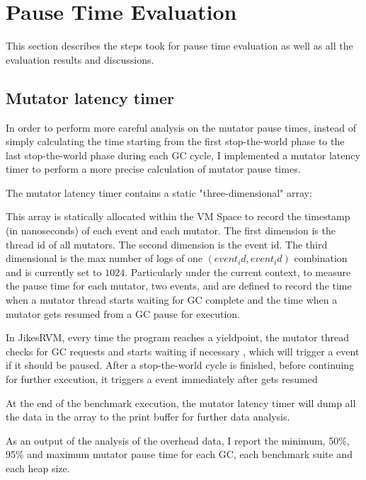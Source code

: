 \section{Pause Time Evaluation} %
\label{sec:pausetime}

This section describes the steps took for pause time evaluation as well as
all the evaluation results and discussions.

\subsection{Mutator latency timer}

In order to perform more careful analysis on the mutator pause times, instead of
simply calculating the time starting from the first stop-the-world phase to the last
stop-the-world phase during each GC cycle, I implemented a mutator latency timer
to perform a more precise calculation of mutator pause times.

The mutator latency timer contains a static "three-dimensional" array:\\
\centerline{}
This array is statically allocated within the VM Space to record the timestamp (in nanoseconds)
of each event and each mutator. The first dimension is the thread id of all
mutators. The second dimension is the event id. The third dimensional  is the
max number of logs of one $(event_id, event_id)$ combination and is currently set to $1024$. Particularly under
the current context, to measure the pause time for each mutator, two events,
 and  are defined to record the time when a
mutator thread starts waiting for GC complete and the time when a mutator gets resumed from a GC pause for execution.

In JikesRVM, every time the program reaches a yieldpoint, the mutator
thread checks for GC requests and starts waiting if necessary , which will trigger a  event if it should
be paused. After a stop-the-world cycle is finished, before continuing for further execution,
it triggers a  event immediately after gets resumed

At the end of the benchmark execution, the mutator latency timer will dump all the
data in the  array to the print buffer for further data analysis.

As an output of the analysis of the overhead data, I report the minimum, 50\%,
95\% and maximum mutator pause time for each GC, each benchmark suite and each heap size.

